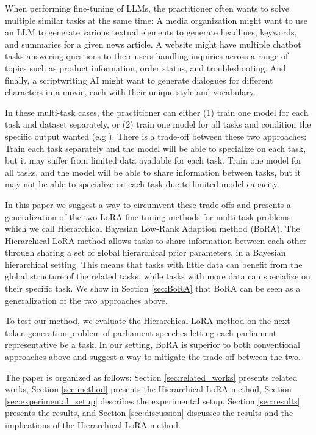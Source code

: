 \documentclass{article}
\begin{document}
When performing fine-tuning of LLMs, the practitioner often wants to solve multiple similar tasks at the same time: 
A media organization might want to use an LLM to generate various textual elements to generate headlines, keywords, and summaries for a given news article. 
A website might have multiple chatbot tasks answering questions to their users handling inquiries across a range of topics such as product information, order status, and troubleshooting.
And finally, a scriptwriting AI might want to generate dialogues for different characters in a movie, each with their unique style and vocabulary.

In these multi-task cases, the practitioner can either (1) train one model for each task and dataset separately, or (2) train one model for all tasks and condition the specific output wanted (e.g \cite{Raffel2019}).
There is a trade-off between these two approaches: Train each task separately and the model will be able to specialize on each task, but it may suffer from limited data available for each task. Train one model for all tasks, and the model will be able to share information between tasks, but it may not be able to specialize on each task due to limited model capacity.

In this paper we suggest a way to circumvent these trade-offs and presents a generalization of the two LoRA fine-tuning methods for multi-task problems, which we call Hierarchical Bayesian Low-Rank Adaption method (BoRA).
The Hierarchical LoRA method allows tasks to share information between each other through sharing a set of global hierarchical prior parameters, in a Bayesian hierarchical setting. 
This means that tasks with little data can benefit from the global structure of the related tasks, while tasks with more data can specialize on their specific task.
We show in Section \ref{sec:BoRA} that BoRA can be seen as a generalization of the two approaches above.

To test our method, we evaluate the Hierarchical LoRA method on the next token generation problem of parliament speeches letting each parliament representative be a task. In our setting, BoRA is superior to both conventional approaches above and suggest a way to mitigate the trade-off between the two.

The paper is organized as follows: Section \ref{sec:related_works} presents related works, Section \ref{sec:method} presents the Hierarchical LoRA method, Section \ref{sec:experimental_setup} describes the experimental setup, Section \ref{sec:results} presents the results, and Section \ref{sec:discussion} discusses the results and the implications of the Hierarchical LoRA method.
\end{document}
